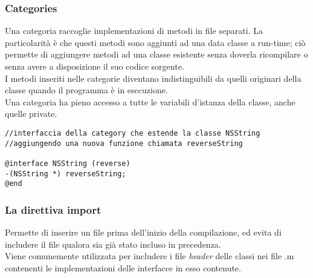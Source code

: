 \subsubsection{Categories}
Una categoria raccoglie implementazioni di metodi in file separati. La particolarità è che questi metodi sono aggiunti ad una data classe a run-time; ciò permette di aggiungere metodi ad una classe esistente senza doverla ricompilare o senza avere a disposizione il suo codice sorgente.\\I metodi inseriti nelle categorie diventano indistinguibili da quelli originari della classe quando il programma è in esecuzione.\\ Una categoria ha pieno accesso a tutte le variabili d'istanza della classe, anche quelle private. 
\lstset{language=[Objective]C, breakindent=40pt, breaklines}
\begin{lstlisting}
//interfaccia della category che estende la classe NSString
//aggiungendo una nuova funzione chiamata reverseString 

@interface NSString (reverse)
-(NSString *) reverseString;
@end
\end{lstlisting}
\subsubsection{La direttiva import}
Permette di inserire un file prima dell'inizio della compilazione, ed evita di includere il file qualora sia già stato incluso in precedenza.\\Viene comunemente utilizzata per includere i file \textit{header} delle classi nei file .m contenenti le implementazioni delle interfacce in esso contenute.
